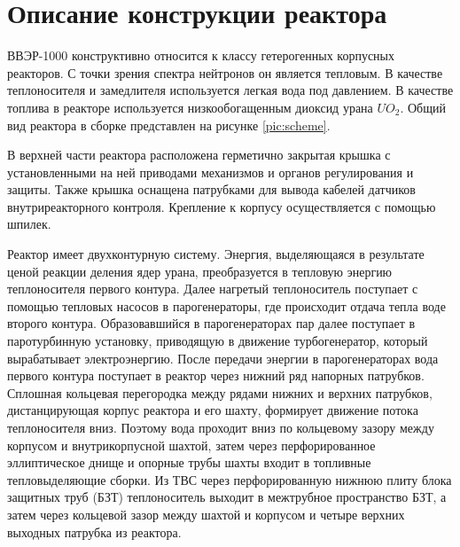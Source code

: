 


\section{Описание конструкции реактора}
ВВЭР-1000 конструктивно относится к классу гетерогенных корпусных реакторов. С точки зрения спектра нейтронов он является тепловым. В качестве теплоносителя и замедлителя используется легкая вода под давлением. В качестве топлива в реакторе используется низкообогащенным диоксид урана $UO_2$. Общий вид реактора в сборке представлен на рисунке \ref{pic:scheme}. 


В верхней части реактора расположена герметично закрытая крышка с установленными на ней приводами механизмов и органов регулирования и защиты. Также крышка оснащена патрубками для вывода кабелей датчиков внутриреакторного контроля. Крепление  к корпусу осуществляется с помощью шпилек. 


Реактор имеет двухконтурную систему. Энергия, выделяющаяся в результате ценой реакции деления ядер урана, преобразуется в тепловую энергию теплоносителя первого контура. Далее нагретый теплоноситель поступает с помощью тепловых насосов в парогенераторы, где происходит отдача тепла воде второго контура. Образовавшийся в парогенераторах пар далее поступает в паротурбинную установку, приводящую в движение турбогенератор, который вырабатывает электроэнергию.
% 
После передачи энергии в парогенераторах вода первого контура поступает в реактор через нижний ряд напорных патрубков. Сплошная кольцевая перегородка между рядами нижних и верхних патрубков, дистанцирующая корпус реактора и его шахту, формирует движение потока теплоносителя вниз. Поэтому вода проходит вниз по кольцевому зазору между корпусом и внутрикорпусной шахтой, затем через перфорированное эллиптическое днище и опорные трубы шахты входит в топливные тепловыделяющие сборки. Из ТВС через перфорированную нижнюю плиту блока защитных труб (БЗТ) теплоноситель выходит в межтрубное пространство БЗТ, а затем через кольцевой зазор между шахтой и корпусом и четыре верхних выходных патрубка из реактора.

